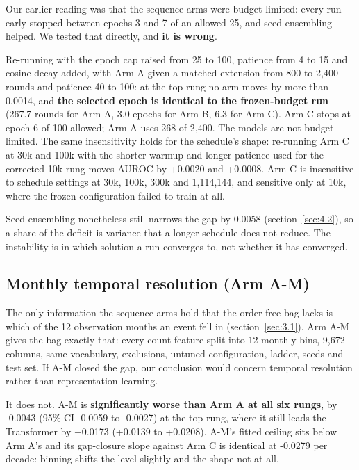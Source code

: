 \documentclass[10pt,twocolumn,letterpaper]{article}
\begin{document}
Our earlier reading was that the sequence arms were budget-limited: every run early-stopped between epochs 3 and 7 of an allowed 25, and seed ensembling helped. We tested that directly, and \textbf{it is wrong}.



Re-running with the epoch cap raised from 25 to 100, patience from 4 to 15 and cosine decay added, with Arm A given a matched extension from 800 to 2,400 rounds and patience 40 to 100: at the top rung no arm moves by more than 0.0014, and \textbf{the selected epoch is identical to the frozen-budget run} (267.7 rounds for Arm A, 3.0 epochs for Arm B, 6.3 for Arm C). Arm C stops at epoch 6 of 100 allowed; Arm A uses 268 of 2,400. The models are not budget-limited. The same insensitivity holds for the schedule's shape: re-running Arm C at 30k and 100k with the shorter warmup and longer patience used for the corrected 10k rung moves AUROC by +0.0020 and +0.0008. Arm C is insensitive to schedule settings at 30k, 100k, 300k and 1,114,144, and sensitive only at 10k, where the frozen configuration failed to train at all.



Seed ensembling nonetheless still narrows the gap by 0.0058 (section~\ref{sec:4.2}), so a share of the deficit is variance that a longer schedule does not reduce. The instability is in which solution a run converges to, not whether it has converged.



\subsection{Monthly temporal resolution (Arm A-M)}\label{sec:5.4}



The only information the sequence arms hold that the order-free bag lacks is which of the 12 observation months an event fell in (section~\ref{sec:3.1}). Arm A-M gives the bag exactly that: every count feature split into 12 monthly bins, 9,672 columns, same vocabulary, exclusions, untuned configuration, ladder, seeds and test set. If A-M closed the gap, our conclusion would concern temporal resolution rather than representation learning.



It does not. A-M is \textbf{significantly worse than Arm A at all six rungs}, by -0.0043 (95\% CI -0.0059 to -0.0027) at the top rung, where it still leads the Transformer by +0.0173 (+0.0139 to +0.0208). A-M's fitted ceiling sits below Arm A's and its gap-closure slope against Arm C is identical at -0.0279 per decade: binning shifts the level slightly and the shape not at all.
\end{document}
